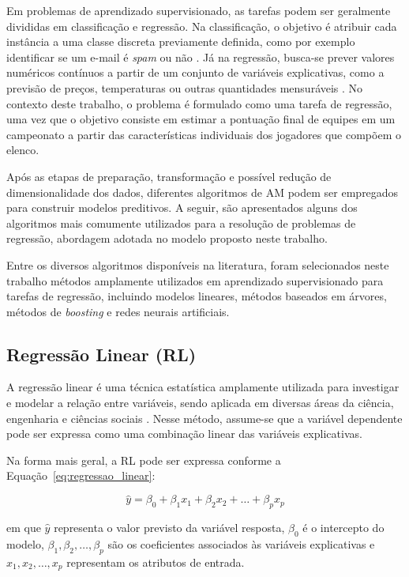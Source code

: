 Em problemas de aprendizado supervisionado, as tarefas podem ser geralmente divididas em classificação e regressão. Na classificação, o objetivo é atribuir 
cada instância a uma classe discreta previamente definida, como por exemplo identificar se um e-mail é \textit{spam} ou não \cite{Geron2019}. 
Já na regressão, busca-se prever valores numéricos 
contínuos a partir de um conjunto de variáveis explicativas, como a previsão de preços, temperaturas ou outras 
quantidades mensuráveis \cite{Geron2019}. No contexto deste trabalho, o problema é formulado como uma tarefa de regressão, 
uma vez que o objetivo consiste em estimar a pontuação final de equipes em um campeonato a partir das características 
individuais dos jogadores que compõem o elenco.

Após as etapas de preparação, transformação e possível redução de dimensionalidade dos dados, diferentes algoritmos de AM podem ser 
empregados para construir modelos preditivos. A seguir, são apresentados alguns dos algoritmos mais comumente utilizados para a resolução de problemas de 
regressão, abordagem adotada no modelo proposto neste trabalho.

Entre os diversos algoritmos disponíveis na literatura, foram selecionados neste trabalho métodos amplamente utilizados em aprendizado supervisionado 
para tarefas de regressão, incluindo modelos lineares, métodos baseados em árvores, métodos de \textit{boosting} e redes neurais artificiais.

\subsection{Regressão Linear (RL)}

A regressão linear é uma técnica estatística amplamente utilizada para investigar e modelar a relação entre variáveis, sendo aplicada em diversas áreas da ciência, 
engenharia e ciências sociais \cite{Montgomery2012}. Nesse método, assume-se que a variável dependente pode ser expressa como uma combinação 
linear das variáveis explicativas.

Na forma mais geral, a RL pode ser expressa conforme a Equação~\ref{eq:regressao_linear}:

\begin{equation}
\hat{y} = \beta_0 + \beta_1 x_1 + \beta_2 x_2 + \dots + \beta_p x_p
\label{eq:regressao_linear}
\end{equation}

em que $\hat{y}$ representa o valor previsto da variável resposta, $\beta_0$ é o intercepto do modelo, $\beta_1, \beta_2, \dots, \beta_p$ são os coeficientes 
associados às variáveis explicativas e $x_1, x_2, \dots, x_p$ representam os atributos de entrada.

